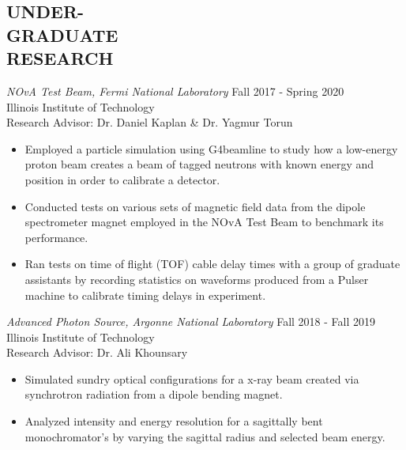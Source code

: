 \documentclass[margin, 10pt]{res} %
\begin{document}
\begin{resume}
 
\section{UNDER-\\GRADUATE \\ RESEARCH}

{\sl NOvA Test Beam, Fermi National Laboratory} \hfill Fall 2017 - Spring 2020 \\
\hfill Illinois Institute of Technology \\
\hfill Research Advisor: Dr. Daniel Kaplan \& Dr. Yagmur Torun
\begin{itemize}
    \item Employed a particle simulation using G4beamline to study how a low-energy proton beam creates a beam of tagged neutrons with known energy and position in order to calibrate a detector.
    \item  Conducted tests on various sets of magnetic field data from the dipole spectrometer magnet employed in the NOvA Test Beam to benchmark its performance.
    \item Ran tests on time of flight (TOF) cable delay times with a group of graduate assistants by recording statistics on waveforms produced from a Pulser machine to calibrate timing delays in experiment.
\end{itemize}
{\sl Advanced Photon Source, Argonne National Laboratory} \hfill Fall 2018 - Fall 2019 \\
\hfill Illinois Institute of Technology \\
\hfill Research Advisor: Dr. Ali Khounsary
\begin{itemize}
    \item  Simulated sundry optical configurations for a x-ray beam created via synchrotron radiation from a dipole bending magnet.
    \item Analyzed intensity and energy resolution for a sagittally bent monochromator's by varying the sagittal radius and selected beam energy. 
\end{itemize}



\end{resume}
\end{document}
